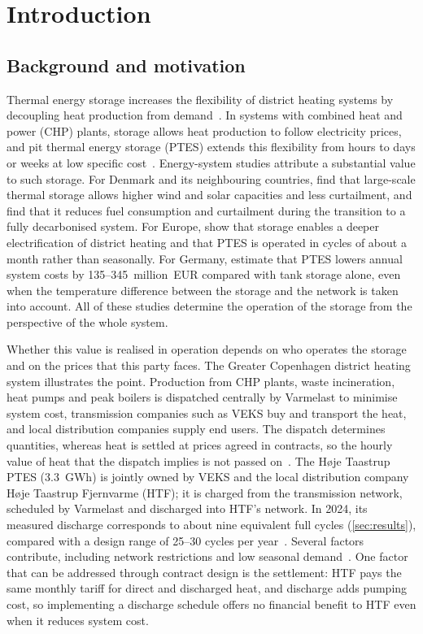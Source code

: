 \section{Introduction}
\label{sec:introduction}

\subsection{Background and motivation}

Thermal energy storage increases the flexibility of district heating systems by decoupling heat production from demand~\cite{guelpa2019review,vandermeulen2018controlling}. In systems with combined heat and power (CHP) plants, storage allows heat production to follow electricity prices, and pit thermal energy storage (PTES) extends this flexibility from hours to days or weeks at low specific cost~\cite{dahash2019seasonal,schmidt2018design}. Energy-system studies attribute a substantial value to such storage. For Denmark and its neighbouring countries, \citet{sifnaios2023impact} find that large-scale thermal storage allows higher wind and solar capacities and less curtailment, and \citet{christensen2024role} find that it reduces fuel consumption and curtailment during the transition to a fully decarbonised system. For Europe, \citet{burkhardt2026flexibility} show that storage enables a deeper electrification of district heating and that PTES is operated in cycles of about a month rather than seasonally. For Germany, \citet{schauss2026mind} estimate that PTES lowers annual system costs by 135--345~million~EUR compared with tank storage alone, even when the temperature difference between the storage and the network is taken into account. All of these studies determine the operation of the storage from the perspective of the whole system.

Whether this value is realised in operation depends on who operates the storage and on the prices that this party faces. The Greater Copenhagen district heating system illustrates the point. Production from CHP plants, waste incineration, heat pumps and peak boilers is dispatched centrally by Varmelast to minimise system cost, transmission companies such as VEKS buy and transport the heat, and local distribution companies supply end users. The dispatch determines quantities, whereas heat is settled at prices agreed in contracts, so the hourly value of heat that the dispatch implies is not passed on~\cite{frolke2022market}. The Høje Taastrup PTES (3.3~GWh) is jointly owned by VEKS and the local distribution company Høje Taastrup Fjernvarme (HTF); it is charged from the transmission network, scheduled by Varmelast and discharged into HTF's network. In 2024, its measured discharge corresponds to about nine equivalent full cycles (\cref{sec:results}), compared with a design range of 25--30 cycles per year~\cite{sifnaios2025performance}. Several factors contribute, including network restrictions and low seasonal demand~\cite{sifnaios2025performance}. One factor that can be addressed through contract design is the settlement: HTF pays the same monthly tariff for direct and discharged heat, and discharge adds pumping cost, so implementing a discharge schedule offers no financial benefit to HTF even when it reduces system cost.

